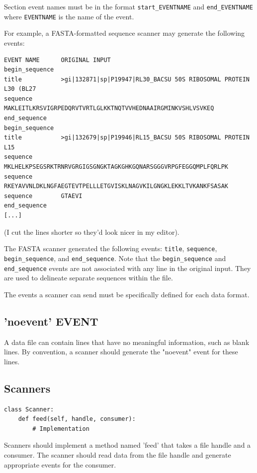 \documentclass{report}
\begin{document}
Section event names must be in the format \verb|start_EVENTNAME| and
\verb|end_EVENTNAME| where \verb|EVENTNAME| is the name of the event.


For example, a FASTA-formatted sequence scanner may generate the
following events:
\begin{verbatim}
EVENT NAME      ORIGINAL INPUT
begin_sequence  
title           >gi|132871|sp|P19947|RL30_BACSU 50S RIBOSOMAL PROTEIN L30 (BL27
sequence        MAKLEITLKRSVIGRPEDQRVTVRTLGLKKTNQTVVHEDNAAIRGMINKVSHLVSVKEQ
end_sequence
begin_sequence
title           >gi|132679|sp|P19946|RL15_BACSU 50S RIBOSOMAL PROTEIN L15
sequence        MKLHELKPSEGSRKTRNRVGRGIGSGNGKTAGKGHKGQNARSGGGVRPGFEGGQMPLFQRLPK
sequence        RKEYAVVNLDKLNGFAEGTEVTPELLLETGVISKLNAGVKILGNGKLEKKLTVKANKFSASAK
sequence        GTAEVI
end_sequence
[...]
\end{verbatim}

(I cut the lines shorter so they'd look nicer in my editor).


The FASTA scanner generated the following events: \verb|title|, \verb|sequence|,
\verb|begin_sequence|, and \verb|end_sequence|.  Note that the \verb|begin_sequence|
and \verb|end_sequence| events are not associated with any line in the
original input.  They are used to delineate separate sequences within
the file.


The events a scanner can send must be specifically defined for each
data format.


\subsection{'noevent' EVENT}

A data file can contain lines that have no meaningful information,
such as blank lines.  By convention, a scanner should generate the
"noevent" event for these lines.




\subsection{Scanners}

\begin{verbatim}
class Scanner:
    def feed(self, handle, consumer):
        # Implementation
\end{verbatim}


Scanners should implement a method named 'feed' that takes a file
handle and a consumer.  The scanner should read data from the file
handle and generate appropriate events for the consumer.
\end{document}
